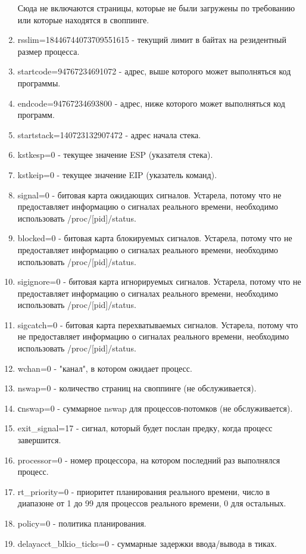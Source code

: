 \documentclass[a4paper,12pt]{article}
\begin{document}
\begin{enumerate}
		Сюда не включаются страницы, которые не были загружены по требованию или которые находятся в своппинге.
		\item rsslim=18446744073709551615 - текущий лимит в байтах на резидентный размер процесса.
		\item startcode=94767234691072 - адрес, выше которого может выполняться код программы.
		\item endcode=94767234693800 - адрес, ниже которого может выполняться код программ.
		\item startstack=140723132907472 - адрес начала стека.
		\item kstkesp=0 - текущее значение ESP (указателя стека).
		\item kstkeip=0 - текущее значение EIP (указатель команд).
		\item signal=0 - битовая карта ожидающих сигналов. Устарела, потому что не предоставляет информацию о сигналах реального времени, необходимо использовать /proc/[pid]/status.
		\item blocked=0 - битовая карта блокируемых сигналов. Устарела, потому что не предоставляет информацию о сигналах реального времени, необходимо использовать /proc/[pid]/status.
		\item sigignore=0 - битовая карта игнорируемых сигналов. Устарела, потому что не предоставляет информацию о сигналах реального времени, необходимо
		использовать /proc/[pid]/status.
		\item sigcatch=0 - битовая карта перехватываемых сигналов. Устарела, потому что не предоставляет информацию о сигналах реального времени, необходимо
		использовать /proc/[pid]/status.
		\item wchan=0 - "канал", в котором ожидает процесс.
		\item nswap=0 - количество страниц на своппинге (не обслуживается).
		\item сnswap=0 - суммарное nswap для процессов-потомков (не обслуживается).
		\item exit\_signal=17 - сигнал, который будет послан предку, когда процесс завершится.
		\item processor=0 - номер процессора, на котором последний раз выполнялся процесс.
		\item rt\_priority=0 - приоритет планирования реального времени, число в диапазоне от
		1 до 99 для процессов реального времени, 0 для остальных.
		\item policy=0 - политика планирования.
		\item delayacct\_blkio\_ticks=0 - суммарные задержки ввода/вывода в тиках.

\end{enumerate}
\end{document}

